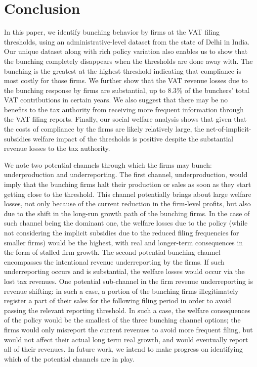 \section{Conclusion}
\label{sec:conclusion}
In this paper, we identify bunching behavior by firms at the VAT filing thresholds, using an administrative-level dataset from the state of Delhi in India. Our unique dataset along with rich policy variation also enables us to show that the bunching completely disappears when the thresholds are done away with. The bunching is the greatest at the highest threshold indicating that compliance is most costly for those firms. We further show that the VAT revenue losses due to the bunching response by firms are substantial, up to 8.3\% of the bunchers' total VAT contributions in certain years. We also suggest that there may be no benefits to the tax authority from receiving more frequent information through the VAT filing reports. Finally, our social welfare analysis shows that given that the costs of compliance by the firms are likely relatively large, the net-of-implicit-subsidies welfare impact of the thresholds is positive despite the substantial revenue losses to the tax authority.

We note two potential channels through which the firms may bunch: underproduction and underreporting. The first channel, underproduction, would imply that the bunching firms halt their production or sales as soon as they start getting close to the threshold. This channel potentially brings about large welfare losses, not only because of the current reduction in the firm-level profits, but also due to the shift in the long-run growth path of the bunching firms. In the case of such channel being the dominant one, the welfare losses due to the policy (while not considering the implicit subsidies due to the reduced filing frequencies for smaller firms) would be the highest, with real and longer-term consequences in the form of stalled firm growth. The second potential bunching channel encompasses the intentional revenue underreporting by the firms. If such underreporting occurs and is substantial, the welfare losses would occur via the lost tax revenues. One potential sub-channel in the firm revenue underreporting is revenue shifting: in such a case, a portion of the bunching firms illegitimately register a part of their sales for the following filing period in order to avoid passing the relevant reporting threshold. In such a case, the welfare consequences of the policy would be the smallest of the three bunching channel options; the firms would only misreport the current revenues to avoid more frequent filing, but would not affect their actual long term real growth, and would eventually report all of their revenues. In future work, we intend to make progress on identifying which of the potential channels are in play.

